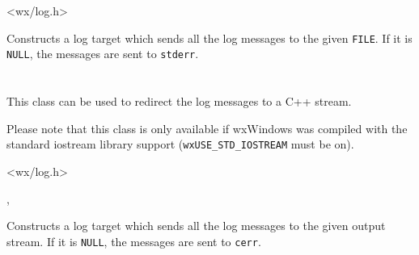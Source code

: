 


<wx/log.h>






Constructs a log target which sends all the log messages to the given 
{\tt FILE}. If it is {\tt NULL}, the messages are sent to {\tt stderr}.


\section{}\label{wxlogstream}

This class can be used to redirect the log messages to a C++ stream.

Please note that this class is only available if wxWindows was compiled with
the standard iostream library support ({\tt wxUSE\_STD\_IOSTREAM} must be on).




<wx/log.h>


,\\




Constructs a log target which sends all the log messages to the given 
output stream. If it is {\tt NULL}, the messages are sent to {\tt cerr}.


\section{}\label{wxlogtextctrl}

